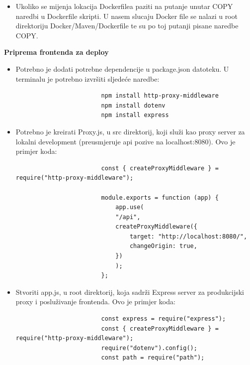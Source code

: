 \begin{packed_enum}
\begin{itemize}
\begin{lstlisting}
						# Kopiranje izvornog koda u container
						COPY ../../.mvn .mvn
						COPY ../../mvnw .
						COPY ../../pom.xml .
						COPY ../../src src
						RUN chmod +x mvnw
						
						# Pokretanje builda
						RUN ./mvnw clean package
						
					
						FROM openjdk:17-alpine
						
						COPY --from=builder target/*.jar /app.jar
						
						EXPOSE 8080
						
						ENTRYPOINT ["java","-jar","/app.jar"]
						
					\end{lstlisting}
					\item Ukoliko se mijenja lokacija Dockerfilea paziti na putanje unutar COPY naredbi u Dockerfile skripti. U nasem slucaju Docker file se nalazi u root direktoriju Docker/Maven/Dockerfile te su po toj putanji pisane naredbe COPY.
				\end{itemize}
				
				\item \textbf{Priprema frontenda za deploy}
				\begin{itemize}
					\item Potrebno je dodati potrebne dependencije u package.json datoteku. U terminalu je potrebno izvršiti sljedeće naredbe:
					\begin{lstlisting}
						npm install http-proxy-middleware
						npm install dotenv
						npm install express
					\end{lstlisting}
					\item Potrebno je kreirati Proxy.js, u src direktorij, koji služi kao proxy server za lokalni development (preusmjeruje api pozive na localhost:8080). Ovo je primjer koda:
					\begin{lstlisting}
						const { createProxyMiddleware } = require("http-proxy-middleware");
						
						module.exports = function (app) {
							app.use(
							"/api",
							createProxyMiddleware({
								target: "http://localhost:8080/",
								changeOrigin: true,
							})
							);
						};
					\end{lstlisting}
					\item Stvoriti app.js, u root direktorij, koja sadrži Express server za produkcijski proxy i posluživanje frontenda. Ovo je primjer koda:
					\begin{lstlisting}
						const express = require("express");
						const { createProxyMiddleware } = require("http-proxy-middleware");
						require("dotenv").config();
						const path = require("path");
						

\end{lstlisting}
\end{itemize}
\end{packed_enum}
